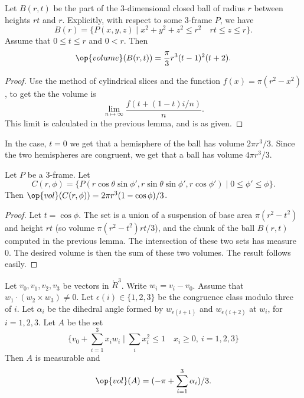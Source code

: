\begin{lemma} Let $B(r,t)$ be the part of the $3$-dimensional closed ball of
radius $r$ between heights $r t$ and $r$.  Explicitly, with respect
to some $3$-frame $P$, we have
    $$
    B(r) = \{P(x,y,z) \mid x^2 + y^2 + z^2\le r^2\quad r t \le z \le r\}.
    $$
Assume that $0\le t\le r$ and $0 < r$. Then
    $$\op{volume}(B(r,t)) = \frac{\pi}{3} r^3 (t-1)^2(t+2).$$
\end{lemma}

\begin{proof}  Use the method of cylindrical slices and the function
$f(x) = \pi(r^2-x^2)$, to get the the volume is
 $$\lim_{n\mapsto\infty} \frac{f(t + (1-t)i/n)}n.$$
This limit is calculated in the previous lemma, and is as given.
\end{proof}

In the case, $t=0$ we get that a hemisphere of the ball has volume
$2\pi r^3/3$.  Since the two hemispheres are congruent, we get that
a ball has volume $4\pi r^3/3$.

\begin{lemma} Let $P$ be a $3$-frame. Let
    $$
    C(r,\phi)=
    \{P(r\cos\theta\sin\phi',r\sin\theta\sin\phi',r\cos\phi')\mid
        0\le\phi'\le\phi\}.
    $$
Then $\op{vol}(C(r,\phi)) = {2\pi r^3(1-\cos\phi)}/3$.
\end{lemma}

\begin{proof} Let $t=\cos\phi$.  The set is a union of a suspension
of base area $\pi(r^2 - t^2)$ and height $r t$ (so volume $\pi
(r^2-t^2) r t/3$), and the chunk of the ball $B(r,t)$ computed in
the previous lemma. The intersection of these two sets has measure
$0$.  The desired volume is then the sum of these two volumes.  The
result follows easily.
\end{proof}



\begin{lemma}
Let $v_0,v_1,v_2,v_3$ be vectors in $\ring{R}^3$.  Write $w_i = v_i
- v_0$.  Assume that $w_1\cdot (w_2 \times w_3) \ne 0$.  Let
$\epsilon(i)\in\{1,2,3\}$ be the congruence class modulo three of
$i$. Let $\alpha_i$ be the dihedral angle formed by
$w_{\epsilon(i+1)}$ and $w_{\epsilon(i+2)}$ at $w_i$, for $i=1,2,3$.
Let $A$ be the set
    $$\{ v_0 + \sum_{i=1}^3 x_i w_i \mid \sum_i x_i^2\le 1\quad
    x_i\ge 0,\ i=1,2,3\}$$
Then $A$ is measurable and
    $$
    \op{vol}(A) = {(-\pi+\sum_{i=1}^3\alpha_i)}/3.
    $$
\end{lemma}

